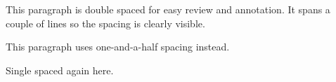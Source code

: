 \documentclass{article}
\begin{document}
\begin{doublespacing}
This paragraph is double spaced for easy review and annotation.
It spans a couple of lines so the spacing is clearly visible.
\end{doublespacing}
\begin{onehalfspacing}
This paragraph uses one-and-a-half spacing instead.
\end{onehalfspacing}
Single spaced again here.\par
\end{document}
